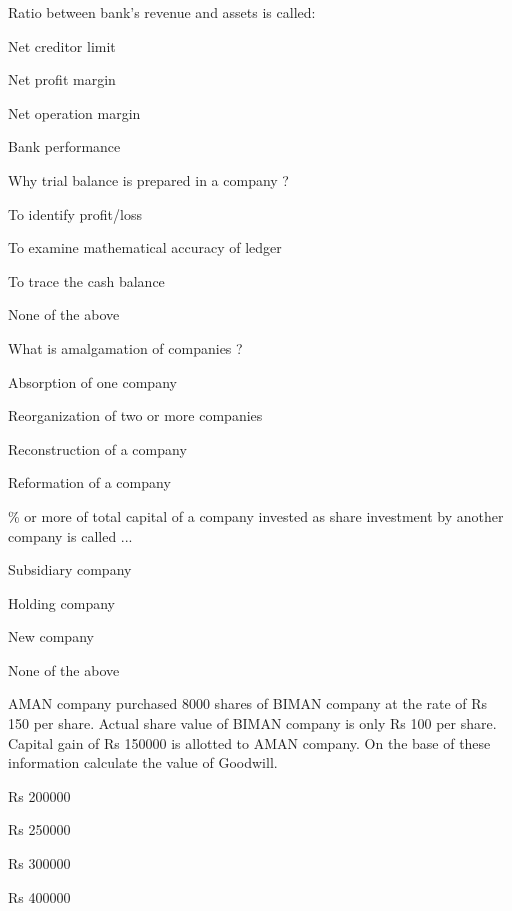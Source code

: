 \begin{questions}
\question Ratio between bank's revenue and assets is called:
  \begin{items}
  \item Net creditor limit
  \item Net profit margin
  \item Net operation margin
  \item Bank performance
  \end{items}

\question Why trial balance is prepared in a company ?
  \begin{items}
  \item To identify profit/loss
  \item To examine mathematical accuracy of ledger
  \item To trace the cash balance
  \item None of the above
  \end{items}

\question What is amalgamation of companies ?
  \begin{items}
  \item Absorption of one company
  \item Reorganization of two or more companies
  \item Reconstruction of a company
  \item Reformation of a company
  \end{items}

\% or more of total capital of a company invested as share investment by another company is called ...
  \begin{items}
  \item Subsidiary company
  \item Holding company
  \item New company
  \item None of the above
  \end{items}

\question AMAN company purchased 8000 shares of BIMAN company at the rate of Rs 150 per share. Actual share value of BIMAN company is only Rs 100 per share. Capital gain of Rs 150000 is allotted to AMAN company. On the base of these information calculate the value of Goodwill.
  \begin{items}
  \item Rs 200000
  \item Rs 250000
  \item Rs 300000
  \item Rs 400000
  \end{items}


\end{questions}

